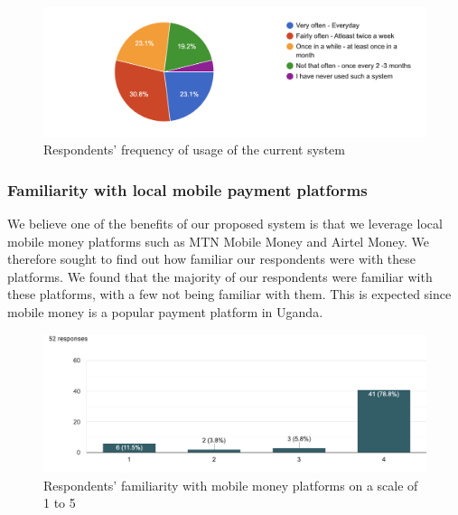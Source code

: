 \begin{figure}[h]
    \begin{center}
        \hspace{-1cm}
        \includegraphics[scale = 0.5]{images/usage}
        \caption{Respondents' frequency of usage of the current system}
    \end{center}
\end{figure}

\clearpage

\subsubsection{Familiarity with local mobile payment platforms}
We believe one of the benefits of our proposed system is that we leverage local mobile money platforms such as MTN Mobile Money and Airtel Money. We therefore sought to find out how familiar our respondents were with these platforms. We found that the majority of our respondents were familiar with these platforms, with a few not being familiar with them. This is expected since mobile money is a popular payment platform in Uganda.


\begin{figure}[h]
    \begin{center}
        \hspace{-1cm}
        \includegraphics[scale = 0.5]{images/mob-mon}
        \caption{Respondents' familiarity with mobile money platforms on a scale of 1 to 5}
    \end{center}
\end{figure}

